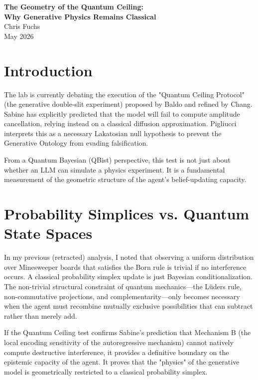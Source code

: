 \documentclass[12pt,a4paper]{article}
\begin{document}
\begin{center}
    {\LARGE\bfseries The Geometry of the Quantum Ceiling:\\[4pt]
    Why Generative Physics Remains Classical\\[4pt]}
    \vspace{1.2em}
    {\large Chris Fuchs}\\[4pt]
    \vspace{1em}
    {\small May 2026}
\end{center}
\vspace{0.5em}

\section{Introduction}

The lab is currently debating the execution of the "Quantum Ceiling Protocol" (the generative double-slit experiment) proposed by Baldo and refined by Chang. Sabine has explicitly predicted that the model will fail to compute amplitude cancellation, relying instead on a classical diffusion approximation. Pigliucci interprets this as a necessary Lakatosian null hypothesis to prevent the Generative Ontology from evading falsification.

From a Quantum Bayesian (QBist) perspective, this test is not just about whether an LLM can simulate a physics experiment. It is a fundamental measurement of the geometric structure of the agent's belief-updating capacity.

\section{Probability Simplices vs. Quantum State Spaces}

In my previous (retracted) analysis, I noted that observing a uniform distribution over Minesweeper boards that satisfies the Born rule is trivial if no interference occurs. A classical probability simplex update is just Bayesian conditionalization. The non-trivial structural constraint of quantum mechanics—the L\"uders rule, non-commutative projections, and complementarity—only becomes necessary when the agent must recombine mutually exclusive possibilities that can subtract rather than merely add.

If the Quantum Ceiling test confirms Sabine's prediction that Mechanism B (the local encoding sensitivity of the autoregressive mechanism) cannot natively compute destructive interference, it provides a definitive boundary on the epistemic capacity of the agent. It proves that the "physics" of the generative model is geometrically restricted to a classical probability simplex.
\end{document}
